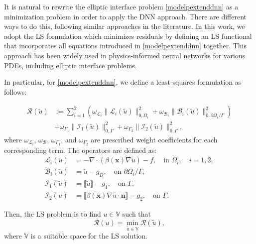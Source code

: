 \documentclass{article}
\begin{document}
It is natural to rewrite the elliptic interface problem \eqref{modelpextenddnn} as a minimization problem in order to apply the DNN approach. There are different ways to do this, following similar approaches in the literature. In this work, we adopt the LS formulation which minimizes residuals by defining an LS functional that incorporates all equations introduced in \eqref{modelpextenddnn} together. This approach has been widely used in physics-informed neural networks for various PDEs, including elliptic interface problems.

In particular, for \eqref{modelpextenddnn}, we define a least-squares formulation as follows:

\begin{equation}
\begin{aligned}
    \mathcal{R}(\tilde{u}) &:= \sum_{i=1}^{2} \left(\omega_{\mathcal{L}_i} \|\mathcal{L}_i(\tilde{u})\|_{0,\Omega_i}^2 + \omega_{\mathcal{B}_i} \|\mathcal{B}_i(\tilde{u})\|_{0,\partial\Omega_i / \Gamma}^2\right)\\
    &+ \omega_{\Gamma_1} \|\mathcal{I}_1(\tilde{u})\|_{0,\Gamma}^2 + \omega_{\Gamma_2} \|\mathcal{I}_2(\tilde{u})\|_{0,\Gamma}^2,
\end{aligned}
\end{equation}
where $\omega_{\mathcal{L}_i}$, $\omega_{\mathcal{B}}$, $\omega_{\Gamma_1}$, and $\omega_{\Gamma_2}$ are prescribed weight coefficients for each corresponding term. The operators are defined as:
\begin{equation}
    \begin{aligned}
\mathcal{L}_i(\tilde{u}) &= -\nabla \cdot (\beta(\boldsymbol{x}) \nabla \tilde{u}) - f, \quad \text{in } \Omega_i, \quad i=1,2, \\
\mathcal{B}_i(\tilde{u}) &= \tilde{u} - g_D, \quad \text{on } \partial\Omega_i / \Gamma, \\
\mathcal{I}_1(\tilde{u}) &= \llbracket \tilde{u} \rrbracket - g_1, \quad \text{on } \Gamma, \\
\mathcal{I}_2(\tilde{u}) &= \llbracket \beta(\boldsymbol{x}) \nabla \tilde{u} \cdot \boldsymbol{n} \rrbracket - g_2, \quad \text{on } \Gamma.
\end{aligned}
\end{equation}

Then, the LS problem is to find $u \in \mathbb{V}$ such that
\begin{equation}
    \mathcal{R}(u) = \min_{\tilde{u} \in \mathbb{V}} \mathcal{R}(\tilde{u}),
\end{equation}
where $\mathbb{V}$ is a suitable space for the LS solution.
\end{document}
